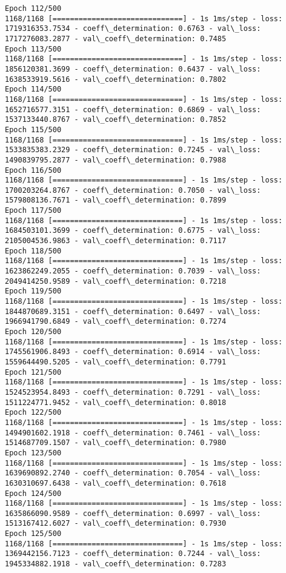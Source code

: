\documentclass[11pt]{article}
\begin{document}
\begin{Verbatim}[commandchars=\\\{\}]
Epoch 112/500
1168/1168 [==============================] - 1s 1ms/step - loss: 1719316353.7534 - coeff\_determination: 0.6763 - val\_loss: 1717276083.2877 - val\_coeff\_determination: 0.7485
Epoch 113/500
1168/1168 [==============================] - 1s 1ms/step - loss: 1856120381.3699 - coeff\_determination: 0.6437 - val\_loss: 1638533919.5616 - val\_coeff\_determination: 0.7802
Epoch 114/500
1168/1168 [==============================] - 1s 1ms/step - loss: 1652716577.3151 - coeff\_determination: 0.6869 - val\_loss: 1537133440.8767 - val\_coeff\_determination: 0.7852
Epoch 115/500
1168/1168 [==============================] - 1s 1ms/step - loss: 1533835383.2329 - coeff\_determination: 0.7245 - val\_loss: 1490839795.2877 - val\_coeff\_determination: 0.7988
Epoch 116/500
1168/1168 [==============================] - 1s 1ms/step - loss: 1700203264.8767 - coeff\_determination: 0.7050 - val\_loss: 1579808136.7671 - val\_coeff\_determination: 0.7899
Epoch 117/500
1168/1168 [==============================] - 1s 1ms/step - loss: 1684503101.3699 - coeff\_determination: 0.6775 - val\_loss: 2105004536.9863 - val\_coeff\_determination: 0.7117
Epoch 118/500
1168/1168 [==============================] - 1s 1ms/step - loss: 1623862249.2055 - coeff\_determination: 0.7039 - val\_loss: 2049414250.9589 - val\_coeff\_determination: 0.7218
Epoch 119/500
1168/1168 [==============================] - 1s 1ms/step - loss: 1844870689.3151 - coeff\_determination: 0.6497 - val\_loss: 1966941790.6849 - val\_coeff\_determination: 0.7274
Epoch 120/500
1168/1168 [==============================] - 1s 1ms/step - loss: 1745561906.8493 - coeff\_determination: 0.6914 - val\_loss: 1559644490.5205 - val\_coeff\_determination: 0.7791
Epoch 121/500
1168/1168 [==============================] - 1s 1ms/step - loss: 1524523954.8493 - coeff\_determination: 0.7291 - val\_loss: 1511224771.9452 - val\_coeff\_determination: 0.8018
Epoch 122/500
1168/1168 [==============================] - 1s 1ms/step - loss: 1494901602.1918 - coeff\_determination: 0.7461 - val\_loss: 1514687709.1507 - val\_coeff\_determination: 0.7980
Epoch 123/500
1168/1168 [==============================] - 1s 1ms/step - loss: 1639690892.2740 - coeff\_determination: 0.7054 - val\_loss: 1630310697.6438 - val\_coeff\_determination: 0.7618
Epoch 124/500
1168/1168 [==============================] - 1s 1ms/step - loss: 1635866090.9589 - coeff\_determination: 0.6997 - val\_loss: 1513167412.6027 - val\_coeff\_determination: 0.7930
Epoch 125/500
1168/1168 [==============================] - 1s 1ms/step - loss: 1369442156.7123 - coeff\_determination: 0.7244 - val\_loss: 1945334882.1918 - val\_coeff\_determination: 0.7283

\end{Verbatim}
\end{document}
